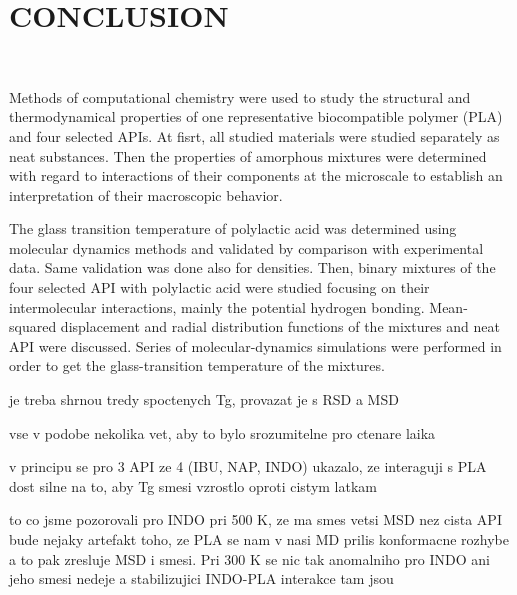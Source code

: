 \clearpage
\section{CONCLUSION}
\

Methods of computational chemistry were used to study the structural and thermodynamical properties of one representative biocompatible polymer (PLA) and four selected APIs. At fisrt, all studied materials were studied separately as neat substances. Then the properties of amorphous mixtures were determined with regard to interactions of their components at the microscale to establish an interpretation of their macroscopic behavior. 

The glass transition temperature of polylactic acid was determined using molecular dynamics methods and validated by comparison with experimental data. Same validation was done also for densities. Then, binary mixtures of the four selected API with polylactic acid were studied focusing on their intermolecular interactions, mainly the potential hydrogen bonding. Mean-squared displacement and radial distribution functions of the mixtures and neat API were discussed. Series of molecular-dynamics simulations were performed in order to get the glass-transition temperature of the mixtures.
 
 je treba shrnou tredy spoctenych Tg, provazat je s RSD a MSD
 
 vse v podobe nekolika vet, aby to bylo srozumitelne pro ctenare laika
 
 v principu se pro 3 API ze 4 (IBU, NAP, INDO) ukazalo, ze interaguji s PLA dost silne na to, aby Tg smesi vzrostlo oproti cistym latkam
 
 to co jsme pozorovali pro INDO pri 500 K, ze ma smes vetsi MSD nez cista API bude nejaky artefakt toho, ze PLA se nam v nasi MD prilis konformacne rozhybe a to pak zresluje MSD i smesi. Pri 300 K se nic tak anomalniho pro INDO ani jeho smesi nedeje a stabilizujici INDO-PLA interakce tam jsou